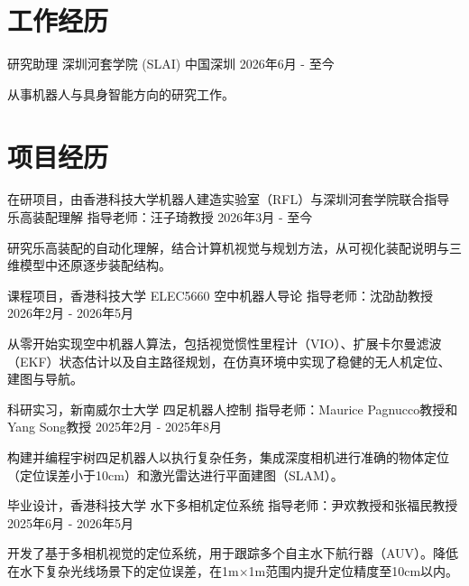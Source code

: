 \section{工作经历}
\cventry
{研究助理} %
{深圳河套学院 (SLAI)} %
{中国深圳} %
{2026年6月 - 至今} %
\begin{cvitems}
\item {从事机器人与具身智能方向的研究工作。}
\end{cvitems}

\section{项目经历}

\cventry
{在研项目，由香港科技大学机器人建造实验室（RFL）与深圳河套学院联合指导} %
{乐高装配理解} %
{指导老师：汪子琦教授} %
{2026年3月 - 至今} %
\begin{cvitems}
\item {研究乐高装配的自动化理解，结合计算机视觉与规划方法，从可视化装配说明与三维模型中还原逐步装配结构。}
\end{cvitems}

\cventry
{课程项目，香港科技大学} %
{ELEC5660 空中机器人导论} %
{指导老师：沈劭劼教授} %
{2026年2月 - 2026年5月} %
\begin{cvitems}
\item {从零开始实现空中机器人算法，包括视觉惯性里程计（VIO）、扩展卡尔曼滤波（EKF）状态估计以及自主路径规划，在仿真环境中实现了稳健的无人机定位、建图与导航。}
\end{cvitems}

\cventry
{科研实习，新南威尔士大学} %
{四足机器人控制} %
{指导老师：Maurice Pagnucco教授和Yang Song教授} %
{2025年2月 - 2025年8月} %
\begin{cvitems}
\item {构建并编程宇树四足机器人以执行复杂任务，集成深度相机进行准确的物体定位（定位误差小于10cm）和激光雷达进行平面建图（SLAM）。}
\end{cvitems}

\cventry
{毕业设计，香港科技大学} %
{水下多相机定位系统} %
{指导老师：尹欢教授和张福民教授} %
{2025年6月 - 2026年5月} %
\begin{cvitems}
\item {开发了基于多相机视觉的定位系统，用于跟踪多个自主水下航行器（AUV）。降低在水下复杂光线场景下的定位误差，在1m$\times$1m范围内提升定位精度至10cm以内。}
\end{cvitems}


